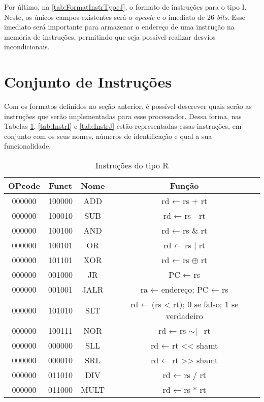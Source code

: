 \documentclass[
	12pt,				%
	oneside,
	a4paper,			%
	english,			%
	french,				%
	spanish,			%
	brazil,				%
	]{abntex2}
\begin{document}
Por último, na \autoref{tab:FormatInstrTypeJ}, o formato de instruções para o tipo I. Neste, os únicos campos existentes será o \emph{opcode} e o imediato de 26 \emph{bits}. Esse imediato será importante para armazenar o endereço de uma instrução na memória de instruções, permitindo que seja possível realizar desvios incondicionais.

\section{Conjunto de Instruções}
Com os formatos definidos no seção anterior, é possível descrever quais serão as instruções que serão implementadas para esse processador. Dessa forma, nas Tabelas \ref{tab:InstrR}, \ref{tab:InstrI} e \ref{tab:InstrJ} estão representadas essas instruções, em conjunto com os seus nomes, números de identificação e qual a sua funcionalidade.


\begin{table}[H]
\centering
\ABNTEXfontereduzida
\caption{Instruções do tipo R} \label{tab:InstrR}
\begin{tabular}{||c c c c||} 
 \hline
 OPcode & Funct & Nome & Função \\ [0.5ex] 
 \hline\hline
 000000 & 100000 & ADD & rd ← rs + rt \\ 
 \hline
 000000 & 100010 & SUB & rd ← rs - rt \\
 \hline
 000000 & 100100 & AND & rd ← rs \& rt \\
 \hline
 000000 & 100101 & OR & rd ← rs | rt \\
 \hline
 000000 & 101101 & XOR & rd ← rs $\oplus$ rt \\
 \hline
 000000 & 001000 & JR & PC ← rs  \\  
 \hline
 000000 & 001001 & JALR & ra ← endereço; PC ← rs \\  
 \hline
 000000 & 101010 & SLT & rd ← (rs < rt); 0 se falso; 1 se verdadeiro\\  
 \hline
 000000 & 100111 & NOR & rd ← rs $\sim|$ \  rt \\
 \hline
 000000 & 000000 & SLL & rd ← rt << shamt \\ 
 \hline
 000000 & 000010 & SRL & rd ← rt >> shamt \\
 \hline
 000000 & 011010 & DIV & rd ← rs / rt \\
 \hline
 000000 & 011000 & MULT & rd ← rs * rt \\
 \hline
\end{tabular}
\end{table}
\end{document}
